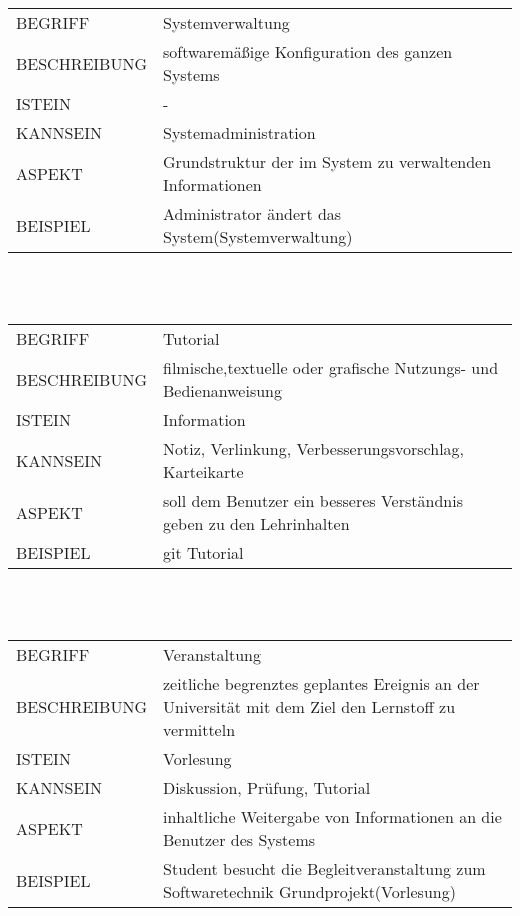 \documentclass[12pt,a4paper]{article}
\begin{document}
\begin{tabular}{l p{10cm}}
BEGRIFF 	 & Systemverwaltung \\ 
BESCHREIBUNG & softwaremäßige Konfiguration des ganzen Systems\\ 
ISTEIN   	 & -\\
KANNSEIN 	 & Systemadministration\\ 
ASPEKT   	 & Grundstruktur der im System zu verwaltenden Informationen\\
BEISPIEL 	 & Administrator ändert das System(Systemverwaltung)\\
\hline
\end{tabular}\\\\  

\begin{tabular}{l p{10cm}}
BEGRIFF 	 & Tutorial \\ 
BESCHREIBUNG & filmische,textuelle oder grafische Nutzungs- und 							   Bedienanweisung \\ 
ISTEIN   	 & Information\\
KANNSEIN 	 & Notiz, Verlinkung, Verbesserungsvorschlag, Karteikarte\\ 
ASPEKT   	 & soll dem Benutzer ein besseres Verständnis geben zu den 					       Lehrinhalten\\
BEISPIEL 	 & git Tutorial\\
\hline
\end{tabular}\\\\  

\begin{tabular}{l p{10cm}}
BEGRIFF 	 & Veranstaltung \\ 
BESCHREIBUNG & zeitliche begrenztes geplantes Ereignis an der Universität mit 				   dem Ziel den Lernstoff zu vermitteln\\ 
ISTEIN   	 & Vorlesung\\
KANNSEIN 	 & Diskussion, Prüfung, Tutorial\\ 
ASPEKT   	 & inhaltliche Weitergabe von Informationen an die Benutzer des 				   Systems\\
BEISPIEL 	 & Student besucht die Begleitveranstaltung zum Softwaretechnik 				   Grundprojekt(Vorlesung)\\
\hline
\end{tabular}\\\\  
\end{document}
